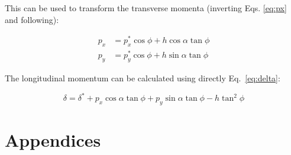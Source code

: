 This can be used to transform the transverse momenta (inverting Eqs. \ref{eq:px} and following):

\begin{align}
p_x &= p_x^* \cos \phi + h \cos \alpha \tan \phi\\
p_y &= p_y^* \cos \phi + h \sin \alpha \tan \phi
\end{align}

The longitudinal momentum can be calculated using directly Eq.~\ref{eq:delta}:

\begin{equation}
\delta = \delta^* + p_x \cos \alpha \tan \phi + p_y \sin \alpha \tan \phi - h \tan^2 \phi
\end{equation}
\newpage

\section*{Appendices}



